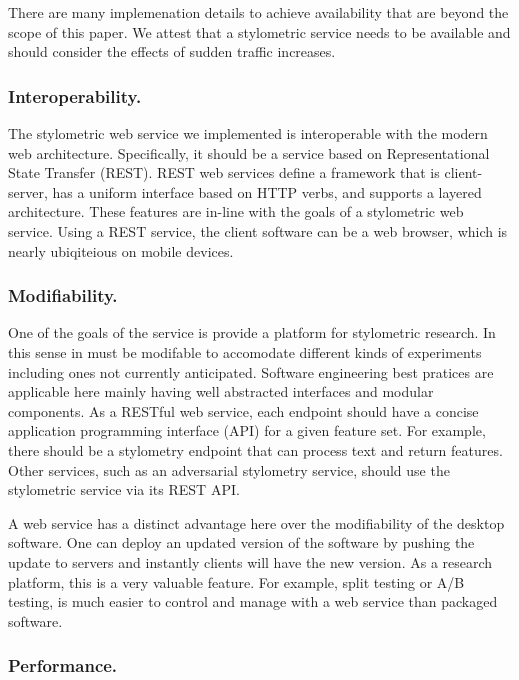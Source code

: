 \documentclass[letterpaper]{article}
\begin{document}
There are many implemenation details to achieve availability that are
beyond the scope of this paper.  We attest that a stylometric service
needs to be available and should consider the effects of sudden
traffic increases.

\subsubsection{Interoperability.}

The stylometric web service we implemented is interoperable with the modern
web architecture.  Specifically, it should be a service based on
Representational State Transfer (REST)\cite{Fielding2000}.  REST web
services define a framework that is client-server, has a uniform
interface based on HTTP verbs, and supports a layered architecture.
These features are in-line with the goals of a stylometric web
service.  Using a REST service, the client software can be a web
browser, which is nearly ubiqiteious on mobile devices.

\subsubsection{Modifiability.}

One of the goals of the service is provide a platform for stylometric
research.  In this sense in must be modifable to accomodate different
kinds of experiments including ones not currently anticipated.
Software engineering best pratices are applicable here mainly having
well abstracted interfaces and modular components.  As a RESTful web
service, each endpoint should have a concise application programming
interface (API) for a given feature set.  For example, there should be
a stylometry endpoint that can process text and return features.
Other services, such as an adversarial stylometry service, should use
the stylometric service via its REST API.

A web service has a distinct advantage here over the modifiability of
the desktop software.  One can deploy an updated version of the
software by pushing the update to servers and instantly clients will
have the new version.  As a research platform, this is a very valuable
feature.  For example, split testing or A/B testing, is much easier to
control and manage with a web service than packaged software.

\subsubsection{Performance.}
\end{document}
